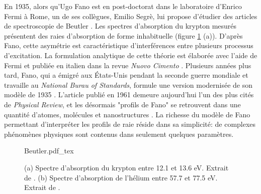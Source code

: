 En 1935, alors qu'Ugo Fano est en post-doctorat dans le laboratoire d'Enrico Fermi à Rome, un de ses collègues, Emilio Segrè, lui propose d'étudier des articles de spectroscopie de Beutler . Les spectres d'absorption du krypton mesurés présentent des raies d'absorption de forme inhabituelle (figure \ref{fig:Beutler} (a)). D'après Fano, cette asymétrie est caractéristique d'interférences entre plusieurs processus d'excitation. La formulation analytique de cette théorie est élaborée avec l'aide de Fermi et publiée en italien dans la revue \textit{Nuovo Cimento} . Plusieurs années plus tard, Fano, qui a émigré aux \'{E}tats-Unis pendant la seconde guerre mondiale et travaille au \textit{National Burau of Standards}, formule une version modernisée de son modèle de 1935 . L'article publié en 1961 demeure aujourd'hui l'un des plus cités de \textit{Physical Review}, et les désormais "profils de Fano" se retrouvent dans une quantité d'atomes, molécules et nanostructures . La richesse du modèle de Fano permettant d'interpréter les profils de raie réside dans sa simplicité: de complexes phénomènes physiques sont contenus dans seulement quelques paramètres.

\begin{figure}
\centering
\def\svgwidth{\textwidth}
{Beutler.pdf_tex}
\caption{(a) Spectre d'absorption du krypton entre 12.1 et 13.6 eV. Extrait de . (b) Spectre d'absorption de l'hélium entre 57.7 et 77.5 eV. Extrait de .}
\label{fig:Beutler}
\end{figure}

%
%

